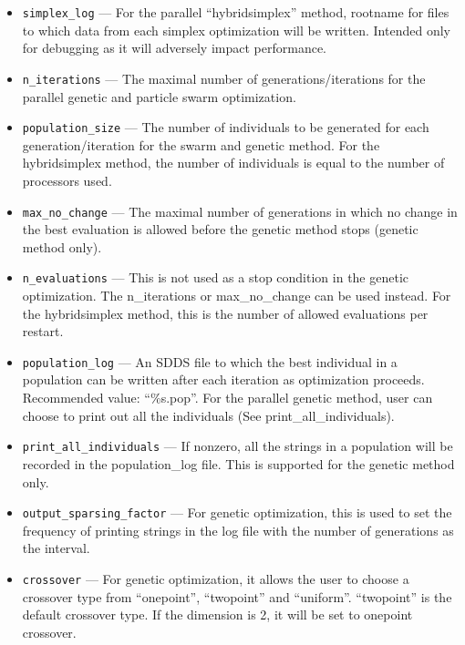 \documentclass[11pt]{article}
\begin{document}
\begin{itemize}
\item \verb|simplex_log| --- For the parallel ``hybridsimplex'' method, rootname for files to which data from each simplex
  optimization will be written. Intended only for debugging as it will adversely impact performance.

\item \verb|n_iterations| --- The maximal number of generations/iterations for the parallel genetic and particle swarm optimization. 

\item \verb|population_size| --- The number of individuals to be generated for each generation/iteration for the swarm and genetic method. For the hybridsimplex method, the number of individuals is equal to the number of processors used.

\item \verb|max_no_change| --- The maximal number of generations in which no change in the best evaluation is allowed before the genetic method stops (genetic method only).

\item \verb|n_evaluations| --- This is not used as a stop condition in the genetic optimization. The n\_iterations or max\_no\_change can be used instead. For the hybridsimplex method, this is the number of allowed evaluations per restart. 

\item \verb|population_log| --- An SDDS file to which the best individual in a population can be written after each iteration as optimization proceeds. Recommended value: ``\%s.pop''. For the parallel genetic method, user can choose to print out all the individuals (See print\_all\_individuals).

\item \verb|print_all_individuals| --- If nonzero, all the strings in a population will be recorded in the population\_log file. This is supported for the genetic method only.

\item \verb|output_sparsing_factor| --- For genetic optimization, this is used to set the frequency of printing strings in the log file with the number of generations as the interval.

\item \verb|crossover| --- For genetic optimization, it allows the user to choose a crossover type from ``onepoint'', ``twopoint'' and ``uniform''. ``twopoint'' is the default crossover type. If the dimension is 2, it will be set to onepoint crossover.

\end{itemize}
\end{document}
